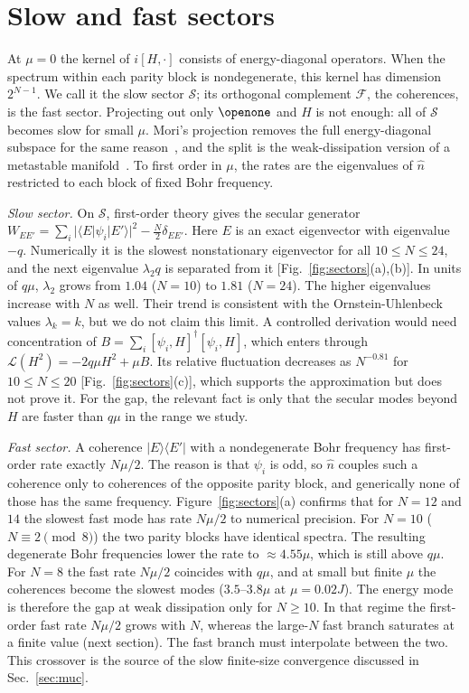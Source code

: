 \documentclass[aps,pre,twocolumn,superscriptaddress,amsmath,amssymb,10pt]{revtex4-2}
\newcommand{\Lc}{\mathcal{L}}
\begin{document}
\section{Slow and fast sectors}

At $\mu=0$ the kernel of $i[H,\cdot]$ consists of energy-diagonal operators. When the spectrum within each parity block is nondegenerate, this kernel has dimension $2^{N-1}$. We call it the slow sector $\mathcal S$; its orthogonal complement $\mathcal F$, the coherences, is the fast sector. Projecting out only $\openone$ and $H$ is not enough: all of $\mathcal S$ becomes slow for small $\mu$. Mori's projection removes the full energy-diagonal subspace for the same reason~\cite{Mori2024}, and the split is the weak-dissipation version of a metastable manifold~\cite{Macieszczak2016}. To first order in $\mu$, the rates are the eigenvalues of $\hat n$ restricted to each block of fixed Bohr frequency.

\emph{Slow sector.} On $\mathcal S$, first-order theory gives the secular generator $W_{EE'}=\sum_i|\langle E|\psi_i|E'\rangle|^2-\tfrac N2\delta_{EE'}$. Here $E$ is an exact eigenvector with eigenvalue $-q$. Numerically it is the slowest nonstationary eigenvector for all $10\le N\le24$, and the next eigenvalue $\lambda_2 q$ is separated from it [Fig.~\ref{fig:sectors}(a),(b)]. In units of $q\mu$, $\lambda_2$ grows from $1.04$ ($N=10$) to $1.81$ ($N=24$). The higher eigenvalues increase with $N$ as well. Their trend is consistent with the Ornstein-Uhlenbeck values $\lambda_k=k$, but we do not claim this limit. A controlled derivation would need concentration of $B=\sum_i[\psi_i,H]^\dagger[\psi_i,H]$, which enters through $\Lc(H^2)=-2q\mu H^2+\mu B$. Its relative fluctuation decreases as $N^{-0.81}$ for $10\le N\le20$ [Fig.~\ref{fig:sectors}(c)], which supports the approximation but does not prove it. For the gap, the relevant fact is only that the secular modes beyond $H$ are faster than $q\mu$ in the range we study.

\emph{Fast sector.} A coherence $|E\rangle\langle E'|$ with a nondegenerate Bohr frequency has first-order rate exactly $N\mu/2$. The reason is that $\psi_i$ is odd, so $\hat n$ couples such a coherence only to coherences of the opposite parity block, and generically none of those has the same frequency. Figure~\ref{fig:sectors}(a) confirms that for $N=12$ and $14$ the slowest fast mode has rate $N\mu/2$ to numerical precision. For $N=10$ ($N\equiv2 \pmod 8$) the two parity blocks have identical spectra. The resulting degenerate Bohr frequencies lower the rate to $\approx4.55\mu$, which is still above $q\mu$. For $N=8$ the fast rate $N\mu/2$ coincides with $q\mu$, and at small but finite $\mu$ the coherences become the slowest modes ($3.5$--$3.8\mu$ at $\mu=0.02J$). The energy mode is therefore the gap at weak dissipation only for $N\ge10$. In that regime the first-order fast rate $N\mu/2$ grows with $N$, whereas the large-$N$ fast branch saturates at a finite value (next section). The fast branch must interpolate between the two. This crossover is the source of the slow finite-size convergence discussed in Sec.~\ref{sec:muc}.
\end{document}
